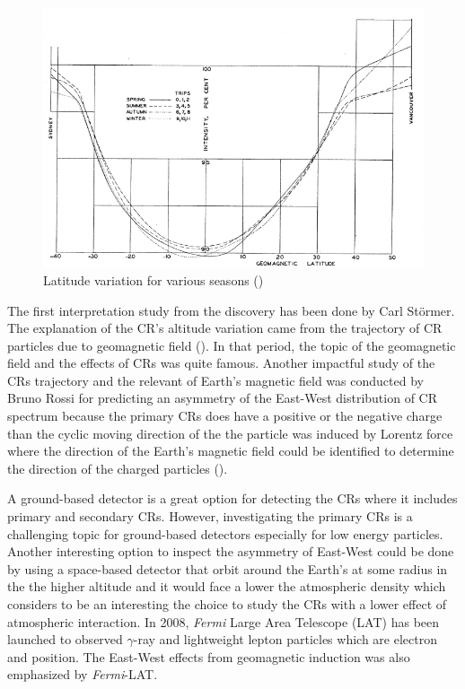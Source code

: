 \begin{figure}[h!]
    \centering
    \includegraphics[width=\textwidth]{content/background/figures/compton_sail_1937.png}
    \caption{Latitude variation for various seasons (\cite{compton1937cosmic})}
    \label{fig:comptonship}
\end{figure}
	
The first interpretation study from the discovery has been
done by Carl Störmer. The explanation of the CR's altitude variation
came from the trajectory of CR particles due to geomagnetic field
(\cite{stormer1934critical}). In that period, the topic of the geomagnetic field and the effects of CRs was quite famous.
Another impactful study of the CRs trajectory and the relevant
of Earth's magnetic field was conducted by Bruno Rossi
for predicting an asymmetry of the East-West distribution
of CR spectrum because the primary CRs does have a positive or
the negative charge than the cyclic moving direction of the 
the particle was induced by Lorentz force where the direction of 
the Earth's magnetic field could be identified to determine the
direction of the charged particles (\cite{rossi1941cosmic}).

A ground-based detector is a great option for 
detecting the CRs where it includes primary and secondary CRs.
However, investigating the primary CRs is a challenging topic
for ground-based detectors especially for low energy particles.
Another interesting option to inspect the asymmetry of 
East-West could be done by using a space-based detector 
that orbit around the Earth's at some radius in the
the higher altitude and it would face a lower 
the atmospheric density which considers to be an interesting 
the choice to study the CRs with a lower effect of atmospheric
interaction. In 2008, \textit{Fermi} Large Area Telescope (LAT)
has been launched to observed $\gamma$-ray and
lightweight lepton particles which are electron
and position. The East-West effects from geomagnetic
induction was also emphasized by \textit{Fermi}-LAT.



